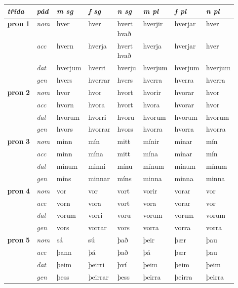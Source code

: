 \begin{longtable}[l]{l>{\footnotesize\itshape}lllllll}
\toprule
 {\textbf{\textit{třída}}} & {\textit{pád}}   & {\textit{m sg}}  & {\textit{f sg}}  & {\textit{n sg}}     & {\textit{m pl}} & {\textit{f pl}}  & {\textit{n pl}} \\
\midrule
\endhead
\multirow{3}{*}{{{\textbf{pron} \Large{\textbf{1}}}}}  & nom & hver & hver    & \specialcell{hvert\\ hvað} & hverjir & hverjar & hver \\*
  & acc &  hvern  & hverja   & \specialcell{hvert\\ hvað} & hverja & hverjar & hver \\*
&  dat & hverjum & hverri   & hverju & hverjum & hverjum & hverjum \\*
  & gen & hvers  & hverrar  & hvers & hverra & hverra & hverra\\
\cmidrule{1-8}

\multirow{3}{*}{{{\textbf{pron} \Large{\textbf{2}}}}}  & nom & hvor & hvor    & hvort & hvorir & hvorar & hvor \\*
  & acc &  hvorn  & hvora   & hvort & hvora & hvorar & hvor \\*
&  dat & hvorum & hvorri   & hvoru & hvorum & hvorum & hvorum \\*
  & gen & hvors  & hvorrar  & hvors & hvorra & hvorra & hvorra\\
\cmidrule{1-8}

\multirow{3}{*}{{{\textbf{pron} \Large{\textbf{3}}}}}  & nom & minn & mín    & mitt & mínir & mínar & mín \\*
  & acc &  minn  & mína   & mitt & mína & mínar & mín \\*
&  dat & mínum & minni   & mínu & mínum & mínum & mínum \\*
  & gen & míns  & minnar  & míns & minna & minna & minna\\
\cmidrule{1-8}

\multirow{3}{*}{{{\textbf{pron} \Large{\textbf{4}}}}}  & nom & vor & vor    & vort & vorir & vorar & vor \\*
  & acc &  vorn  & vora   & vort & vora & vorar & vor \\*
&  dat & vorum & vorri   & voru & vorum & vorum & vorum \\*
  & gen & vors  & vorrar  & vors & vorra & vorra & vorra\\
\cmidrule{1-8}


\multirow{3}{*}{{{\textbf{pron} \Large{\textbf{5}}}}}  & nom & sá & sú    & það & þeir & þær & þau \\*
  & acc &  þann  & þá   & það & þá & þær & þau \\*
&  dat & þeim & þeirri   & því & þeim & þeim & þeim \\*
  & gen & þess  & þeirrar  & þess & þeirra & þeirra & þeirra\\
\cmidrule{1-8}


\end{longtable}
